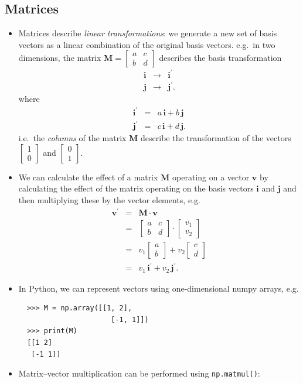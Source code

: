 \documentclass[a4paper]{article}
\newcommand{\bvec}[1]{\boldsymbol{\mathbf{#1}}}
\newcommand{\cvec}[2]{\begin{bmatrix}#1\\#2\end{bmatrix}}
\begin{document}
\subsection{Matrices}
\begin{itemize}
  \item Matrices describe \emph{linear transformations}: we generate a new set of basis vectors as a linear combination of the original basis vectors. e.g.\ in two dimensions, the matrix $\bvec{M}=\begin{bmatrix}a & c\\b & d\end{bmatrix}$ describes the basis transformation
  \begin{eqnarray}
  \bvec{i} & \to & \bvec{i^\prime}\\
  \bvec{j} & \to & \bvec{j^\prime}.
  \end{eqnarray}
  where
  \begin{eqnarray}
  \bvec{i^\prime} & = & a\,\bvec{i} + b\,\bvec{j} \\
  \bvec{j^\prime} & = & c\,\bvec{i} + d\,\bvec{j}.
  \end{eqnarray}
  i.e.\ the \emph{columns} of the matrix $\bvec{M}$ describe the transformation of the vectors $\cvec{1}{0}$ and $\cvec{0}{1}$.
  \item We can calculate the effect of a matrix $\bvec{M}$ operating on a vector $\bvec{v}$ by calculating the effect of the matrix operating on the basis vectors $\bvec{i}$ and $\bvec{j}$ and then multiplying these by the vector elements, e.g.
  \begin{eqnarray}
  \bvec{v^\prime} & = & \bvec{M}\cdot\bvec{v}\\
  & = & \begin{bmatrix}a & c\\b & d\end{bmatrix}\cdot\cvec{v_1}{v_2} \\
  & = & v_1\cvec{a}{b} + v_2\cvec{c}{d} \\
  & = & v_1\,\bvec{i^\prime} + v_2\,\bvec{j^\prime}.
  \end{eqnarray}
  \item In Python, we can represent vectors using one-dimensional numpy arrays, e.g.
  \begin{lstlisting}
  >>> M = np.array([[1, 2],
                      [-1, 1]])
  >>> print(M)
  [[1 2]
   [-1 1]]
  \end{lstlisting}
  \item Matrix--vector multiplication can be performed using \texttt{np.matmul()}:

\end{itemize}
\end{document}
